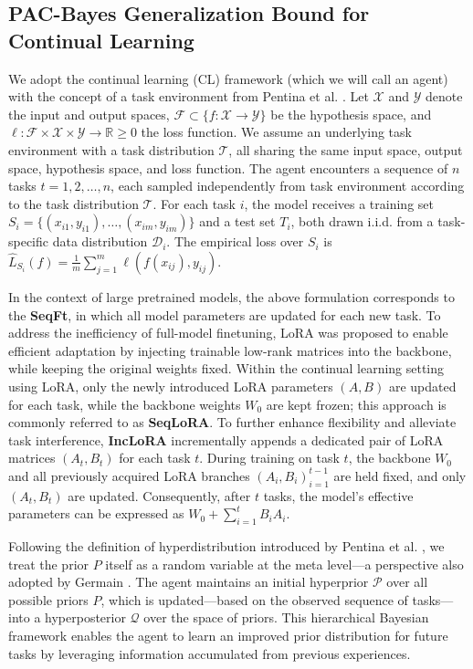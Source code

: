 \documentclass[letterpaper]{article} %
\begin{document}
\subsection{PAC-Bayes Generalization Bound for Continual Learning }
We adopt the continual learning (CL) framework (which we will call an agent) with the concept of a task environment from Pentina et al. . Let $\mathcal{X}$ and $\mathcal{Y}$ denote the input and output spaces, $\mathcal{F} \subset \{f : \mathcal{X} \to \mathcal{Y}\}$ be the hypothesis space, and $\ell: \mathcal{F} \times \mathcal{X} \times \mathcal{Y} \to \mathbb{R}{\geq 0}$ the loss function. We assume an underlying task environment with a task distribution $\mathcal{T}$, all sharing the same input space, output space, hypothesis space, and loss function. The agent encounters a sequence of $n$ tasks ${t=1, 2, \ldots, n}$, each sampled independently from task environment according to the task distribution $\mathcal{T}$. For each task $i$, the model receives a training set $S_i = \{(x_{i1}, y_{i1}), \ldots, (x_{im}, y_{im})\}$ and a test set $T_i$, both drawn i.i.d. from a task-specific data distribution $\mathcal{D}_i$. The empirical loss over
$S_i$ is $\widehat{L}_{S_i}(f) = \frac{1}{m}\sum_{j=1}^{m} \ell(f(x_{ij}), y_{ij})$.

In the context of large pretrained models, the above formulation corresponds to the \textbf{SeqFt}, in which all model parameters are updated for each new task. To address the inefficiency of full-model finetuning, LoRA was proposed to enable efficient adaptation by injecting trainable low-rank matrices into the backbone, while keeping the original weights fixed. Within the continual learning setting using LoRA, only the newly introduced LoRA parameters $(A, B)$ are updated for each task, while the backbone weights $W_0$ are kept frozen; this approach is commonly referred to as \textbf{SeqLoRA}. To further enhance flexibility and alleviate task interference, \textbf{IncLoRA} incrementally appends a dedicated pair of LoRA matrices $(A_t, B_t)$ for each task $t$. During training on task $t$, the backbone $W_0$ and all previously acquired LoRA branches ${(A_i, B_i)}_{i=1}^{t-1}$ are held fixed, and only $(A_t, B_t)$ are updated. Consequently, after $t$ tasks, the model’s effective parameters can be expressed as $W_0 + \sum_{i=1}^{t} B_i A_i$.







Following the definition of hyperdistribution introduced by Pentina et al. , we treat the prior $P$ itself as a random variable at the meta level—a perspective also adopted by Germain . The agent maintains an initial hyperprior $\mathcal{P}$ over all possible priors $P$, which is updated—based on the observed sequence of tasks—into a hyperposterior $\mathcal{Q}$ over the space of priors. This hierarchical Bayesian framework enables the agent to learn an improved prior distribution for future tasks by leveraging information accumulated from previous experiences.
\end{document}
